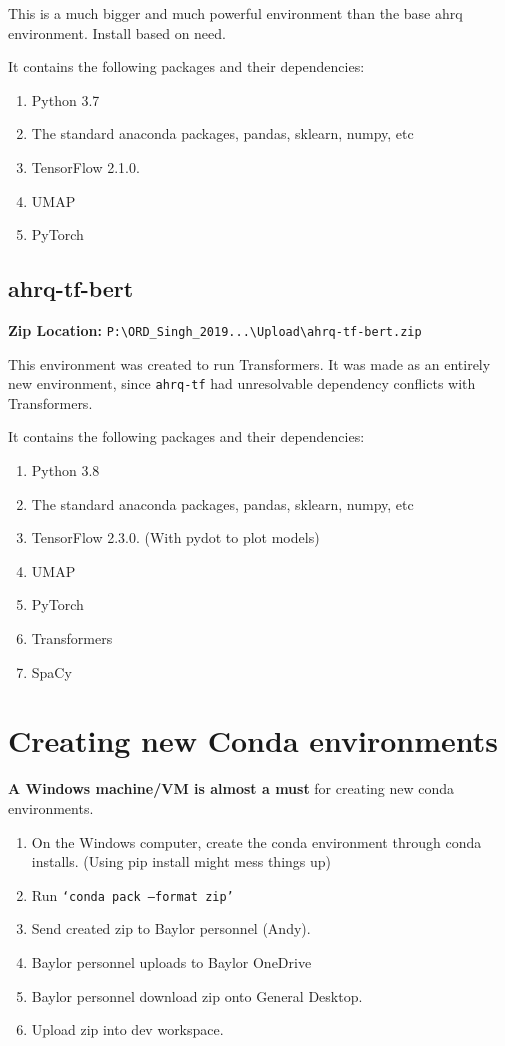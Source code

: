 \documentclass[12pt]{article}
\theoremstyle{definition}
\begin{document}
This is a much bigger and much powerful environment than the base ahrq environment. Install based on need.

It contains the following packages and their dependencies:
\begin{enumerate}
    \item Python 3.7
    \item The standard anaconda packages, pandas, sklearn, numpy, etc
    \item TensorFlow 2.1.0.
    \item UMAP
    \item PyTorch
\end{enumerate}


\subsection{ahrq-tf-bert}
\textbf{Zip Location: }\texttt{P:\textbackslash ORD\_Singh\_2019...\textbackslash Upload\textbackslash ahrq-tf-bert.zip}

This environment was created to run Transformers. It was made as an entirely new environment, since \texttt{ahrq-tf} had unresolvable dependency conflicts with Transformers.

It contains the following packages and their dependencies:
\begin{enumerate}
    \item Python 3.8
    \item The standard anaconda packages, pandas, sklearn, numpy, etc
    \item TensorFlow 2.3.0. (With pydot to plot models)
    \item UMAP
    \item PyTorch
    \item Transformers
    \item SpaCy
\end{enumerate}


\section{Creating new Conda environments}
\textbf{A Windows machine/VM is almost a must} for creating new conda environments.
\begin{enumerate}
    \item On the Windows computer, create the conda environment through conda installs. (Using pip install might mess things up)
    \item Run \texttt{`conda pack --format zip'}
    \item Send created zip to Baylor personnel (Andy). 
    \item Baylor personnel uploads to Baylor OneDrive
    \item Baylor personnel download zip onto General Desktop.
    \item Upload zip into dev workspace.
\end{enumerate}
\end{document}
